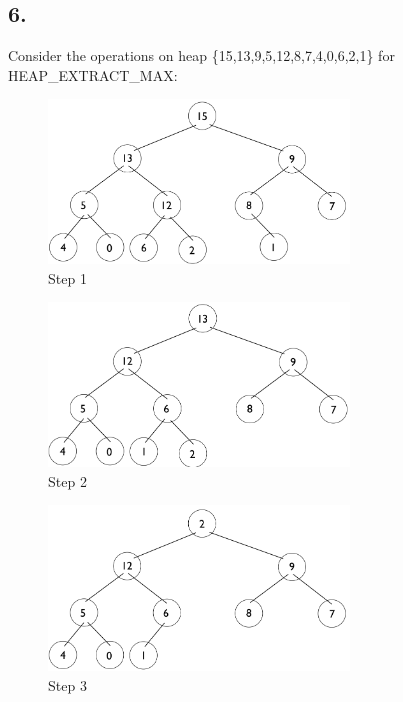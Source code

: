 \documentclass[11pt,letterpaper]{article}
\begin{document}
\pagebreak


\subsection*{6.}
Consider the operations on heap \{15,13,9,5,12,8,7,4,0,6,2,1\} for HEAP\_EXTRACT\_MAX:

\begin{figure}[!ht]

	\begin{center}
	\includegraphics[width=80mm]{images/6_5_1_1_tree.png}
	\end{center}

\caption{Step 1 }
\end{figure}

\begin{figure}[!ht]

	\begin{center}
	\includegraphics[width=80mm]{images/6_5_1_2_tree.png}
	\end{center}

\caption{Step 2 }
\end{figure}

\pagebreak

\begin{figure}[!ht]

	\begin{center}
	\includegraphics[width=80mm]{images/6_5_1_3_tree.png}
	\end{center}

\caption{Step 3 }
\end{figure}
\end{document}
